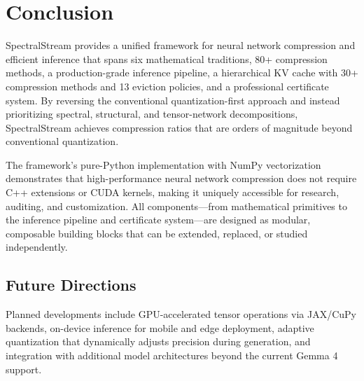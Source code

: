 \documentclass[11pt,a4paper,twocolumn]{article}
\begin{document}
\section{Conclusion}
\label{sec:conclusion}

SpectralStream provides a unified framework for neural network compression and efficient inference that spans six mathematical traditions, 80+ compression methods, a production-grade inference pipeline, a hierarchical KV cache with 30+ compression methods and 13 eviction policies, and a professional certificate system. By reversing the conventional quantization-first approach and instead prioritizing spectral, structural, and tensor-network decompositions, SpectralStream achieves compression ratios that are orders of magnitude beyond conventional quantization.

The framework's pure-Python implementation with NumPy vectorization demonstrates that high-performance neural network compression does not require C++ extensions or CUDA kernels, making it uniquely accessible for research, auditing, and customization. All components---from mathematical primitives to the inference pipeline and certificate system---are designed as modular, composable building blocks that can be extended, replaced, or studied independently.

\subsection*{Future Directions}
Planned developments include GPU-accelerated tensor operations via JAX/CuPy backends, on-device inference for mobile and edge deployment, adaptive quantization that dynamically adjusts precision during generation, and integration with additional model architectures beyond the current Gemma 4 support.
\end{document}
